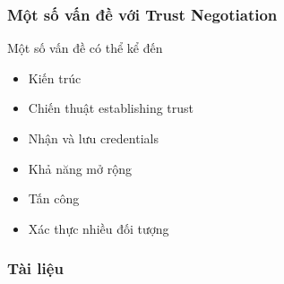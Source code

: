 \documentclass[11pt]{beamer}
\begin{document}
\begin{frame}
\frametitle{Một số vấn đề với Trust Negotiation}
Một số vấn đề có thể kể đến\cite{10.1007/3-540-44875-6_20}
\begin{itemize}
\item Kiến trúc%
\item Chiến thuật establishing trust
\item Nhận và lưu credentials
\item Khả năng mở rộng
\item Tấn công
\item Xác thực nhiều đối tượng
\end{itemize}
\end{frame}

\begin{frame}
\frametitle{Tài liệu}
\printbibliography
\end{frame}
\end{document}
